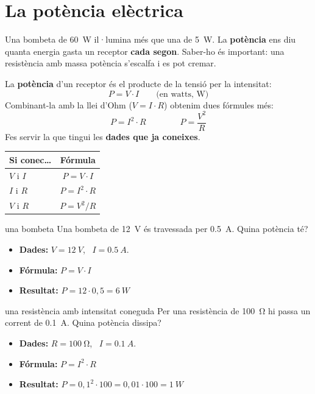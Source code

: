 \section{La potència elèctrica}

Una bombeta de \SI{60}{W} il·lumina més que una de \SI{5}{W}. La \textbf{potència} ens diu quanta energia gasta un receptor \textbf{cada segon}. Saber-ho és important: una resistència amb massa potència s'escalfa i es pot cremar.

\begin{idea}
La \textbf{potència} d'un receptor és el producte de la tensió per la intensitat:
\[ P = V \cdot I \qquad \text{(en watts, W)} \]
Combinant-la amb la llei d'Ohm ($V = I \cdot R$) obtenim dues fórmules més:
\[ P = I^2 \cdot R \qquad\qquad P = \frac{V^2}{R} \]
Fes servir la que tingui les \textbf{dades que ja coneixes}.
\end{idea}

\begin{center}
\renewcommand{\arraystretch}{1.5}
\begin{tabular}{@{}lc@{}}
\toprule
\textbf{Si conec\ldots} & \textbf{Fórmula}\\
\midrule
$V$ i $I$ & $P = V \cdot I$\\
$I$ i $R$ & $P = I^2 \cdot R$\\
$V$ i $R$ & $P = V^2 / R$\\
\bottomrule
\end{tabular}
\end{center}

\begin{exemple}{una bombeta}
Una bombeta de \SI{12}{V} és travessada per \SI{0,5}{A}. Quina potència té?
\begin{itemize}
 \item \textbf{Dades:} $V = \SI{12}{V}$, \ $I = \SI{0,5}{A}$.
 \item \textbf{Fórmula:} $P = V \cdot I$
 \item \textbf{Resultat:} $P = 12 \cdot 0{,}5 = \SI{6}{W}$
\end{itemize}
\end{exemple}

\begin{exemple}{una resistència amb intensitat coneguda}
Per una resistència de \SI{100}{\ohm} hi passa un corrent de \SI{0,1}{A}. Quina potència dissipa?
\begin{itemize}
 \item \textbf{Dades:} $R = \SI{100}{\ohm}$, \ $I = \SI{0,1}{A}$.
 \item \textbf{Fórmula:} $P = I^2 \cdot R$
 \item \textbf{Resultat:} $P = 0{,}1^2 \cdot 100 = 0{,}01 \cdot 100 = \SI{1}{W}$
\end{itemize}
\end{exemple}

